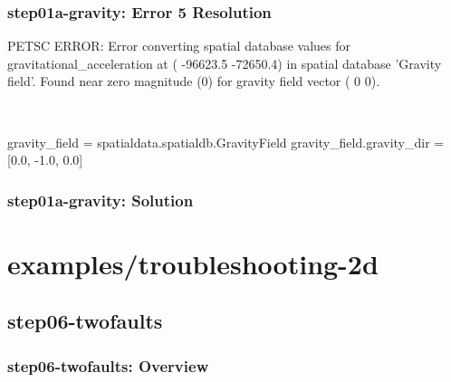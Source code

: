 \documentclass[aspectratio=169]{beamer}
\begin{document}
\begin{frame}[t,fragile]
  \frametitle{{\ttfamily step01a-gravity}: Error 5 Resolution}

  \tserror
  \begin{pyrejournal}
[0]PETSC ERROR: Error converting spatial database values for gravitational_acceleration at (  -96623.5  -72650.4) in
spatial database 'Gravity field'. Found near zero magnitude (0) for gravity field vector (  0  0).
  \end{pyrejournal}

  \pause\\[1pt]

  \begin{cfgcode}
    gravity_field = spatialdata.spatialdb.GravityField
    gravity_field.gravity_dir = [0.0, -1.0, 0.0]
  \end{cfgcode}

\end{frame}


\begin{frame}[fragile]
  \frametitle{{\ttfamily step01a-gravity}: Solution}

  
\end{frame}


\section{{\ttfamily examples/troubleshooting-2d}}
\subsection{{\ttfamily step06-twofaults}}

\begin{frame}[fragile]
  \frametitle{{\ttfamily step06-twofaults}: Overview}


  
\end{frame}
\end{document}
